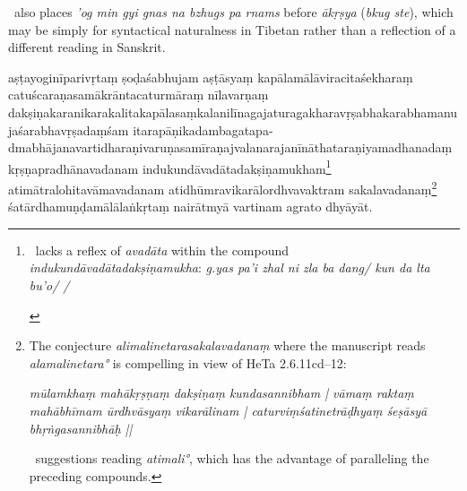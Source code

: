 \documentclass[naipra.tex]{subfiles}
\begin{document}
\begin{sanskrit}
{\begin{english}
		\TIB\ also places \emph{'og min gyi gnas na bzhugs pa rnams} before \emph{ākṛṣya} (\emph{bkug ste}), which may be simply for syntactical naturalness in Tibetan rather than a reflection of a different reading in Sanskrit.
	\end{english}
} aṣṭayoginīparivṛtaṃ ṣoḍaśabhujam aṣṭāsyaṃ kapālamālāviracitaśekharaṃ catuścaraṇasamākrāntacaturmāraṃ nīlavarṇaṃ dakṣiṇakaranikarakalitakapālasaṃkalanilīnagaja\dsh turaga\dsh khara\dsh vṛṣabha\dsh karabha\dsh manuja\dsh śarabha\dsh vṛṣadaṃśam itarapāṇikadambagatapa-\\ dmabhājanavartidharaṇi\dsh varuṇa\dsh samīraṇa\dsh jvalana\dsh rajanīnātha\dsh taraṇi\dsh yama\dsh dhanadaṃ kṛṣṇapradhānavadanam indukundāvadātadakṣiṇamukham\footnote{
	\begin{english}%
		\TIB\ lacks a reflex of \emph{avadāta} within the compound \emph{indukundāvadātadakṣiṇamukha}: \emph{g.yas pa'i zhal ni zla ba dang/ kun da lta bu'o/ /}
	\end{english}
} atimātralohitavāmavadanam atidhūmravikarālordhvavaktram sakalavadanaṃ\footnote{
	The conjecture \emph{alimalinetarasakalavadanaṃ} where the manuscript reads \emph{alamalinetara°} is compelling in view of HeTa 2.6.11cd–12:
	\begin{sanskrit}
		\emph{mūlamkhaṃ mahākṛṣṇaṃ dakṣiṇaṃ kundasannibham | vāmaṃ raktaṃ mahābhīmam ūrdhvāsyaṃ vikarālinam | caturviṃśatinetrāḍhyaṃ śeṣāsyā bhṛṅgasannibhāḥ ||}
	\end{sanskrit}
	\TIB\ suggestions reading \emph{atimali°}, which has the advantage of paralleling the preceding compounds.
} śatārdhamuṇḍamālālaṅkṛtaṃ nairātmyā vartinam agrato dhyāyāt. 
\pend




\end{sanskrit}
\end{document}
